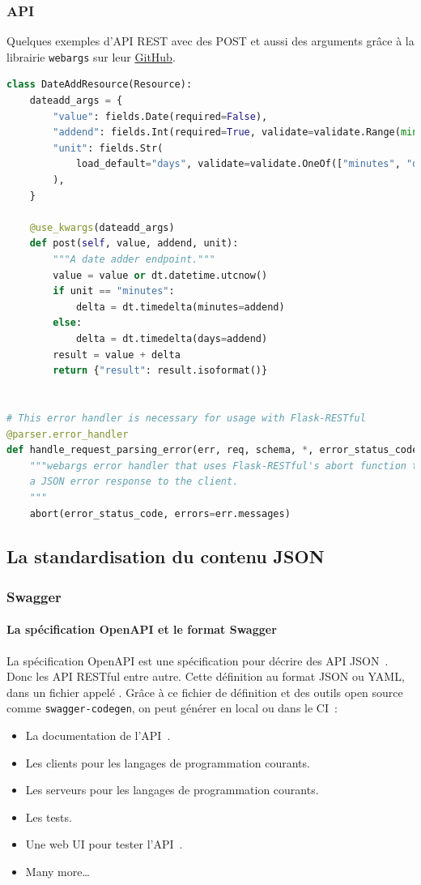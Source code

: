 \documentclass{beamer}
\begin{document}
    \begin{frame}[fragile]
        \transdissolve
        \frametitle{API}
        Quelques exemples d'API REST avec des POST et aussi des arguments grâce à la librairie \lstinline{webargs} sur leur \href{https://github.com/marshmallow-code/webargs/blob/dev/examples/flaskrestful_example.py}{GitHub}.
        \begin{lstlisting}[language=python,basicstyle=\ttfamily\tiny]
class DateAddResource(Resource):
    dateadd_args = {
        "value": fields.Date(required=False),
        "addend": fields.Int(required=True, validate=validate.Range(min=1)),
        "unit": fields.Str(
            load_default="days", validate=validate.OneOf(["minutes", "days"])
        ),
    }

    @use_kwargs(dateadd_args)
    def post(self, value, addend, unit):
        """A date adder endpoint."""
        value = value or dt.datetime.utcnow()
        if unit == "minutes":
            delta = dt.timedelta(minutes=addend)
        else:
            delta = dt.timedelta(days=addend)
        result = value + delta
        return {"result": result.isoformat()}


# This error handler is necessary for usage with Flask-RESTful
@parser.error_handler
def handle_request_parsing_error(err, req, schema, *, error_status_code, error_headers):
    """webargs error handler that uses Flask-RESTful's abort function to return
    a JSON error response to the client.
    """
    abort(error_status_code, errors=err.messages)
        \end{lstlisting}
    \end{frame}

    \subsection{La standardisation du contenu JSON}\label{subsec:api-json}

    \begin{frame}[fragile]
        \transdissolve
        \frametitle{Swagger}
        \framesubtitle{La spécification OpenAPI et le format Swagger}
        La spécification OpenAPI est une spécification pour décrire des API JSON~.
        Donc les API RESTful entre autre.
        \bigbreak
        Cette définition au format JSON ou YAML, dans un fichier appelé .
        \bigbreak
        Grâce à ce fichier de définition et des outils open source comme \lstinline{swagger-codegen}, on peut générer en local ou dans le CI~:
        \begin{itemize}
            \item La documentation de l'API~.
            \item Les clients pour les langages de programmation courants.
            \item Les serveurs pour les langages de programmation courants.
            \item Les tests.
            \item Une web UI pour tester l'API~.
            \item Many more\ldots
        \end{itemize}
    \end{frame}
\end{document}
